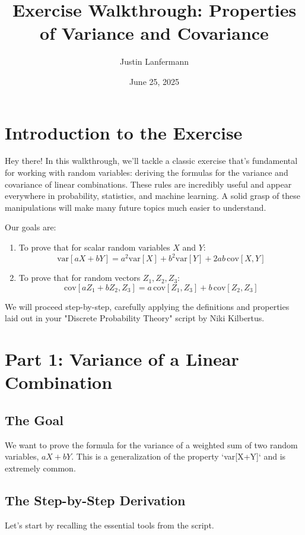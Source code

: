 \documentclass[11pt,a4paper]{article}
\title{Exercise Walkthrough: Properties of Variance and Covariance}
\author{Justin Lanfermann}
\date{June 25, 2025}
\begin{document}
\maketitle
\thispagestyle{empty}
\newpage

\tableofcontents
\thispagestyle{empty}
\newpage

\setcounter{page}{1}

\section{Introduction to the Exercise}

Hey there! In this walkthrough, we'll tackle a classic exercise that's fundamental for working with random variables: deriving the formulas for the variance and covariance of linear combinations. These rules are incredibly useful and appear everywhere in probability, statistics, and machine learning. A solid grasp of these manipulations will make many future topics much easier to understand.

Our goals are:
\begin{enumerate}
    \item To prove that for scalar random variables $X$ and $Y$:
    \[
        \text{var}[aX + bY] = a^2 \text{var}[X] + b^2 \text{var}[Y] + 2ab\,\text{cov}[X,Y]
    \]
    \item To prove that for random vectors $Z_1, Z_2, Z_3$:
    \[
        \text{cov}[aZ_1 + bZ_2, Z_3] = a\,\text{cov}[Z_1, Z_3] + b\,\text{cov}[Z_2, Z_3]
    \]
\end{enumerate}
We will proceed step-by-step, carefully applying the definitions and properties laid out in your "Discrete Probability Theory" script by Niki Kilbertus.

\section{Part 1: Variance of a Linear Combination}

\subsection{The Goal}
We want to prove the formula for the variance of a weighted sum of two random variables, $aX + bY$. This is a generalization of the property `var[X+Y]` and is extremely common.

\subsection{The Step-by-Step Derivation}
Let's start by recalling the essential tools from the script.
\end{document}
